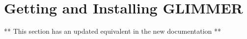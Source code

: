 \section{Getting and Installing GLIMMER}
** This section has an updated equivalent in the new documentation **
%
%
%
%
%
